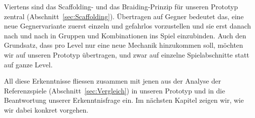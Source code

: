 \documentclass[../Main.tex]{subfiles}
\begin{document}
Viertens sind das Scaffolding- und das Braiding-Prinzip für unseren Prototyp zentral (Abschnitt~\ref{sec:Scaffolding}). Übertragen auf Gegner bedeutet das, eine neue Gegnervariante zuerst einzeln und gefahrlos vorzustellen und sie erst danach nach und nach in Gruppen und Kombinationen ins Spiel einzubinden. Auch den Grundsatz, dass pro Level nur eine neue Mechanik hinzukommen soll, möchten wir auf unseren Prototyp übertragen, und zwar auf einzelne Spielabschnitte statt auf ganze Level.

All diese Erkenntnisse fliessen zusammen mit jenen aus der Analyse der Referenzspiele (Abschnitt~\ref{sec:Vergleich}) in unseren Prototyp und in die Beantwortung unserer Erkenntnisfrage ein. Im nächsten Kapitel zeigen wir, wie wir dabei konkret vorgehen.
\end{document}

